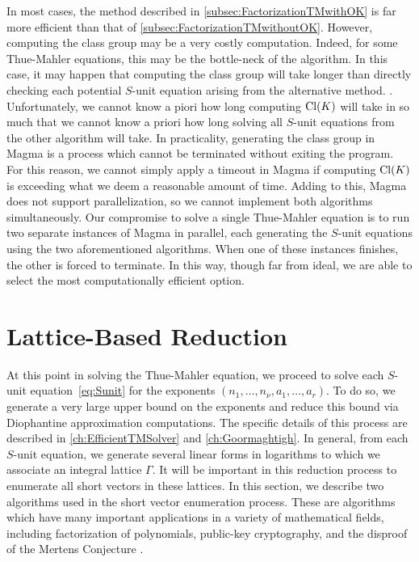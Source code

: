 In most cases, the method described in \autoref{subsec:FactorizationTMwithOK} is far more efficient than that of \autoref{subsec:FactorizationTMwithoutOK}. However, computing the class group may be a very costly computation. Indeed, for some Thue-Mahler equations, this may be the bottle-neck of the algorithm. In this case, it may happen that computing the class group will take longer than directly checking each potential $S$-unit equation arising from the alternative method. . Unfortunately, we cannot know a piori how long computing $\operatorname{Cl}(K)$ will take in so much that we cannot know a priori how long solving all $S$-unit equations from the other algorithm will take. In practicality, generating the class group in Magma  is a process which cannot be terminated without exiting the program. For this reason, we cannot simply apply a timeout in Magma if computing $\operatorname{Cl}(K)$ is exceeding what we deem a reasonable amount of time. Adding to this, Magma does not support parallelization, so we cannot implement both algorithms simultaneously. Our compromise to solve a single Thue-Mahler equation is to run two separate instances of Magma in parallel, each generating the $S$-unit equations using the two aforementioned algorithms. When one of these instances finishes, the other is forced to terminate. In this way, though far from ideal, we are able to select the most computationally efficient option. 


\section{Lattice-Based Reduction}
\label{sec:LatticeReduction}


At this point in solving the Thue-Mahler equation, we proceed to solve each $S$-unit equation~\eqref{eq:Sunit} for the exponents $(n_1, \dots, n_{\nu}, a_1, \dots, a_r)$. To do so, we generate a very large upper bound on the exponents and reduce this bound via Diophantine approximation computations. The specific details of this process are described in \autoref{ch:EfficientTMSolver} and \autoref{ch:Goormaghtigh}. In general, from each $S$-unit equation, we generate several linear forms in logarithms to which we associate an integral lattice $\Gamma$. It will be important in this reduction process to enumerate all short vectors in these lattices. In this section, we describe two algorithms used in the short vector enumeration process. These are algorithms which have many important applications in a variety of mathematical fields, including factorization of polynomials, public-key cryptography, and the disproof of the Mertens Conjecture . 

